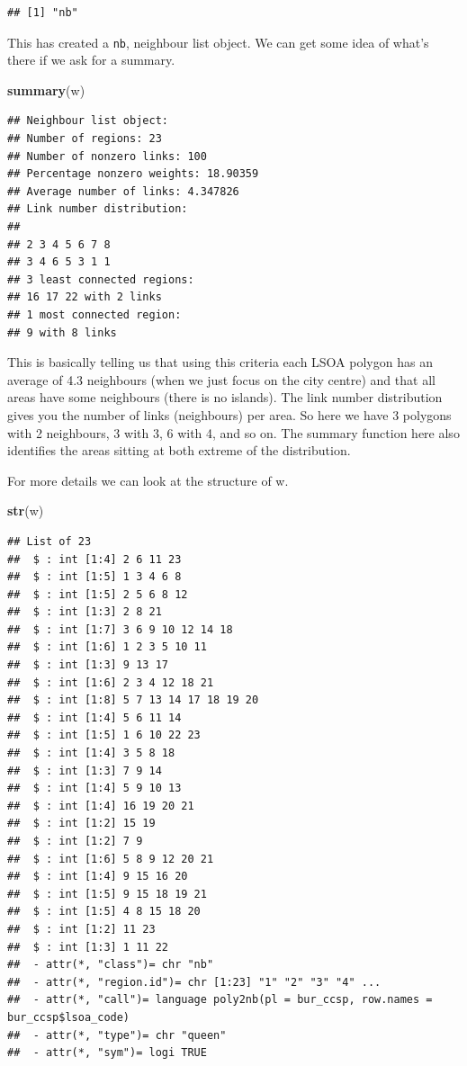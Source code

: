 \documentclass[]{book}
\newenvironment{Shaded}{\begin{snugshade}}{\end{snugshade}}
\newcommand{\KeywordTok}[1]{\textcolor[rgb]{0.13,0.29,0.53}{\textbf{#1}}}
\newcommand{\NormalTok}[1]{#1}
\begin{document}
\begin{verbatim}
## [1] "nb"
\end{verbatim}

This has created a \texttt{nb}, neighbour list object. We can get some idea of what's there if we ask for a summary.

\begin{Shaded}
\begin{Highlighting}[]
\KeywordTok{summary}\NormalTok{(w)}
\end{Highlighting}
\end{Shaded}

\begin{verbatim}
## Neighbour list object:
## Number of regions: 23 
## Number of nonzero links: 100 
## Percentage nonzero weights: 18.90359 
## Average number of links: 4.347826 
## Link number distribution:
## 
## 2 3 4 5 6 7 8 
## 3 4 6 5 3 1 1 
## 3 least connected regions:
## 16 17 22 with 2 links
## 1 most connected region:
## 9 with 8 links
\end{verbatim}

This is basically telling us that using this criteria each LSOA polygon has an average of 4.3 neighbours (when we just focus on the city centre) and that all areas have some neighbours (there is no islands). The link number distribution gives you the number of links (neighbours) per area. So here we have 3 polygons with 2 neighbours, 3 with 3, 6 with 4, and so on. The summary function here also identifies the areas sitting at both extreme of the distribution.

For more details we can look at the structure of w.

\begin{Shaded}
\begin{Highlighting}[]
\KeywordTok{str}\NormalTok{(w)}
\end{Highlighting}
\end{Shaded}

\begin{verbatim}
## List of 23
##  $ : int [1:4] 2 6 11 23
##  $ : int [1:5] 1 3 4 6 8
##  $ : int [1:5] 2 5 6 8 12
##  $ : int [1:3] 2 8 21
##  $ : int [1:7] 3 6 9 10 12 14 18
##  $ : int [1:6] 1 2 3 5 10 11
##  $ : int [1:3] 9 13 17
##  $ : int [1:6] 2 3 4 12 18 21
##  $ : int [1:8] 5 7 13 14 17 18 19 20
##  $ : int [1:4] 5 6 11 14
##  $ : int [1:5] 1 6 10 22 23
##  $ : int [1:4] 3 5 8 18
##  $ : int [1:3] 7 9 14
##  $ : int [1:4] 5 9 10 13
##  $ : int [1:4] 16 19 20 21
##  $ : int [1:2] 15 19
##  $ : int [1:2] 7 9
##  $ : int [1:6] 5 8 9 12 20 21
##  $ : int [1:4] 9 15 16 20
##  $ : int [1:5] 9 15 18 19 21
##  $ : int [1:5] 4 8 15 18 20
##  $ : int [1:2] 11 23
##  $ : int [1:3] 1 11 22
##  - attr(*, "class")= chr "nb"
##  - attr(*, "region.id")= chr [1:23] "1" "2" "3" "4" ...
##  - attr(*, "call")= language poly2nb(pl = bur_ccsp, row.names = bur_ccsp$lsoa_code)
##  - attr(*, "type")= chr "queen"
##  - attr(*, "sym")= logi TRUE
\end{verbatim}
\end{document}
